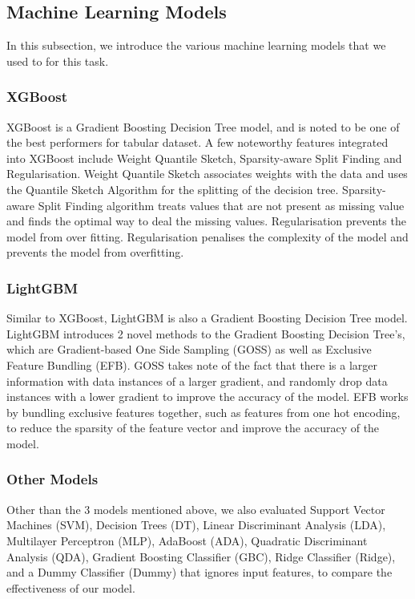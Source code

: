 \documentclass[runningheads]{llncs}
\begin{document}
\subsection{Machine Learning Models}
In this subsection, we introduce the various machine learning models that we used to for this task.
\subsubsection{XGBoost}
XGBoost is a Gradient Boosting Decision Tree model, and is noted to be one of the best performers for tabular dataset. A few noteworthy features integrated into XGBoost include Weight Quantile Sketch, Sparsity-aware Split Finding and Regularisation. Weight Quantile Sketch associates weights with the data and uses the Quantile Sketch Algorithm for the splitting of the decision tree. Sparsity-aware Split Finding algorithm treats values that are not present as missing value and finds the optimal way to deal the missing values. Regularisation prevents the model from over fitting. Regularisation penalises the complexity of the model and prevents the model from overfitting.
\subsubsection{LightGBM}
Similar to XGBoost, LightGBM is also a Gradient Boosting Decision Tree model. LightGBM introduces 2 novel methods to the Gradient Boosting Decision Tree's, which are Gradient-based One Side Sampling (GOSS) as well as Exclusive Feature Bundling (EFB). GOSS takes note of the fact that there is a larger information with data instances of a larger gradient, and randomly drop data instances with a lower gradient to improve the accuracy of the model. EFB works by bundling exclusive features together, such as features from one hot encoding, to reduce the sparsity of the feature vector and improve the accuracy of the model.

\subsubsection{Other Models} Other than the 3 models mentioned above, we also evaluated Support Vector Machines (SVM), Decision Trees (DT), Linear Discriminant Analysis (LDA), Multilayer Perceptron (MLP), AdaBoost (ADA), Quadratic Discriminant Analysis (QDA), Gradient Boosting Classifier (GBC), Ridge Classifier (Ridge), and a Dummy Classifier (Dummy) that ignores input features, to compare the effectiveness of our model. 
\end{document}
